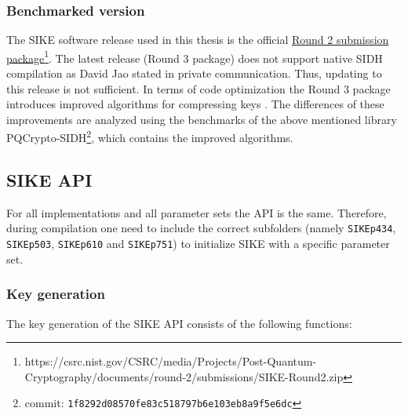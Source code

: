 \subsubsection{Benchmarked version}
The \gls{SIKE} software release used in this thesis is the official \href{https://csrc.nist.gov/CSRC/media/Projects/Post-Quantum-Cryptography/documents/round-2/submissions/SIKE-Round2.zip}{Round 2 submission package}\footnote{https://csrc.nist.gov/CSRC/media/Projects/Post-Quantum-Cryptography/documents/round-2/submissions/SIKE-Round2.zip}. The latest release (Round 3 package) does not support native SIDH compilation as David Jao stated in private communication. Thus, updating to this release is not sufficient. In terms of code optimization the Round 3 package introduces improved algorithms for compressing keys \parencite{sike2020spec}. The differences of these improvements are analyzed using the benchmarks of the above mentioned library \gls{PQCrypto-SIDH}\footnote{commit: \texttt{1f8292d08570fe83c518797b6e103eb8a9f5e6dc}}, which contains the improved algorithms.

\subsection{\gls{SIKE} API}
For all implementations and all parameter sets the API is the same. Therefore, during compilation one need to include the correct subfolders (namely \texttt{SIKEp434}, \texttt{SIKEp503}, \texttt{SIKEp610} and \texttt{SIKEp751}) to initialize \gls{SIKE} with a specific parameter set.

\subsubsection{Key generation}

The key generation of the \gls{SIKE} API consists of the following functions:


